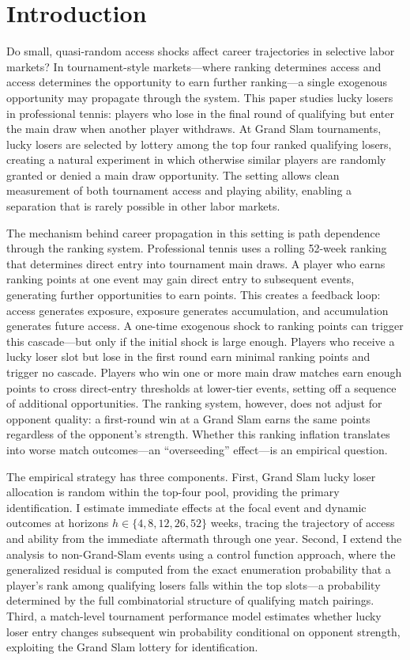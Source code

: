 \section{Introduction}
\label{sec:intro}

Do small, quasi-random access shocks affect career trajectories in selective labor markets? In tournament-style markets---where ranking determines access and access determines the opportunity to earn further ranking---a single exogenous opportunity may propagate through the system. This paper studies lucky losers in professional tennis: players who lose in the final round of qualifying but enter the main draw when another player withdraws. At Grand Slam tournaments, lucky losers are selected by lottery among the top four ranked qualifying losers, creating a natural experiment in which otherwise similar players are randomly granted or denied a main draw opportunity. The setting allows clean measurement of both tournament access and playing ability, enabling a separation that is rarely possible in other labor markets.

The mechanism behind career propagation in this setting is path dependence through the ranking system. Professional tennis uses a rolling 52-week ranking that determines direct entry into tournament main draws. A player who earns ranking points at one event may gain direct entry to subsequent events, generating further opportunities to earn points. This creates a feedback loop: access generates exposure, exposure generates accumulation, and accumulation generates future access. A one-time exogenous shock to ranking points can trigger this cascade---but only if the initial shock is large enough. Players who receive a lucky loser slot but lose in the first round earn minimal ranking points and trigger no cascade. Players who win one or more main draw matches earn enough points to cross direct-entry thresholds at lower-tier events, setting off a sequence of additional opportunities. The ranking system, however, does not adjust for opponent quality: a first-round win at a Grand Slam earns the same points regardless of the opponent's strength. Whether this ranking inflation translates into worse match outcomes---an ``overseeding'' effect---is an empirical question.

The empirical strategy has three components. First, Grand Slam lucky loser allocation is random within the top-four pool, providing the primary identification. I estimate immediate effects at the focal event and dynamic outcomes at horizons $h \in \{4, 8, 12, 26, 52\}$ weeks, tracing the trajectory of access and ability from the immediate aftermath through one year. Second, I extend the analysis to non-Grand-Slam events using a control function approach, where the generalized residual is computed from the exact enumeration probability that a player's rank among qualifying losers falls within the top slots---a probability determined by the full combinatorial structure of qualifying match pairings. Third, a match-level tournament performance model estimates whether lucky loser entry changes subsequent win probability conditional on opponent strength, exploiting the Grand Slam lottery for identification.

